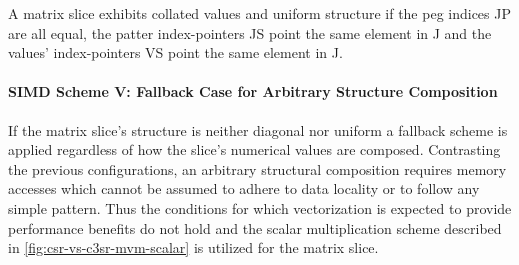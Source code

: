           A matrix slice exhibits collated values and uniform structure if the peg indices JP are all equal, the
          patter index-pointers JS point the same element in J and the values' index-pointers VS point the same element
          in J.

          \begin{figure}[H]
            \centering
            \captionsetup{width=0.9\columnwidth}
            
            \label{fig:simd-scheme-iv-data-layout}
          \end{figure}

        \paragraph{SIMD Scheme V: Fallback Case for Arbitrary Structure Composition}

          If the matrix slice's structure is neither diagonal nor uniform a fallback scheme is applied regardless of how
          the slice's numerical values are composed. Contrasting the previous configurations, an arbitrary structural
          composition requires memory accesses which cannot be assumed to adhere to data locality or to follow any
          simple pattern. Thus the conditions for which vectorization is expected to provide performance benefits do not
          hold and the scalar multiplication scheme described in \ref{fig:csr-vs-c3sr-mvm-scalar} is utilized for the
          matrix slice.
